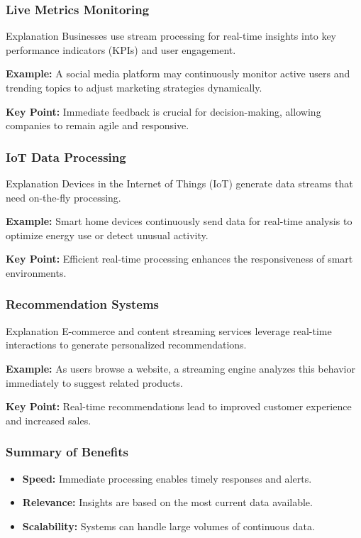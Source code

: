 \documentclass{beamer}
\begin{document}
\begin{frame}[fragile]
    \frametitle{Live Metrics Monitoring}
    \begin{block}{Explanation}
        Businesses use stream processing for real-time insights into key performance indicators (KPIs) and user engagement.
    \end{block}
    
    \textbf{Example:} 
    A social media platform may continuously monitor active users and trending topics to adjust marketing strategies dynamically.
    
    \textbf{Key Point:} 
    Immediate feedback is crucial for decision-making, allowing companies to remain agile and responsive.
\end{frame}

\begin{frame}[fragile]
    \frametitle{IoT Data Processing}
    \begin{block}{Explanation}
        Devices in the Internet of Things (IoT) generate data streams that need on-the-fly processing.
    \end{block}
    
    \textbf{Example:} 
    Smart home devices continuously send data for real-time analysis to optimize energy use or detect unusual activity.
    
    \textbf{Key Point:} 
    Efficient real-time processing enhances the responsiveness of smart environments.
\end{frame}

\begin{frame}[fragile]
    \frametitle{Recommendation Systems}
    \begin{block}{Explanation}
        E-commerce and content streaming services leverage real-time interactions to generate personalized recommendations.
    \end{block}
    
    \textbf{Example:} 
    As users browse a website, a streaming engine analyzes this behavior immediately to suggest related products.
    
    \textbf{Key Point:} 
    Real-time recommendations lead to improved customer experience and increased sales.
\end{frame}

\begin{frame}[fragile]
    \frametitle{Summary of Benefits}
    \begin{itemize}
        \item \textbf{Speed:} Immediate processing enables timely responses and alerts.
        \item \textbf{Relevance:} Insights are based on the most current data available.
        \item \textbf{Scalability:} Systems can handle large volumes of continuous data.
    \end{itemize}
\end{frame}
\end{document}
